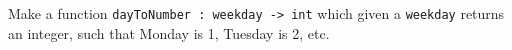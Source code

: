 Make a function \lstinline{dayToNumber : weekday -> int} which given a \lstinline{weekday} returns an integer, such that Monday is 1, Tuesday is 2, etc.
